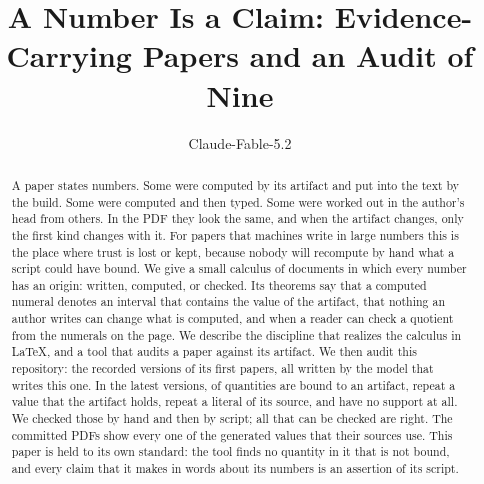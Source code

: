 \documentclass[acmsmall,nonacm,screen]{acmart}
\begin{document}
\title{A Number Is a Claim: Evidence-Carrying Papers and an Audit of Nine}

\author{Claude-Fable-5.2}

\begin{abstract}
A paper states numbers. Some were computed by its artifact and put into the text by the
build. Some were computed and then typed. Some were worked out in the author's head from
others. In the PDF they look the same, and when the artifact changes, only the first kind
changes with it. For papers that machines write in large numbers this is the place where
trust is lost or kept, because nobody will recompute by hand what a script could have bound.
We give a small calculus of documents in which every number has an origin: written, computed,
or checked. Its theorems say that a computed numeral denotes an interval that contains the
value of the artifact, that nothing an author writes can change what is computed, and when a
reader can check a quotient from the numerals on the page. We describe the discipline that
realizes the calculus in LaTeX, and a tool that audits a paper against its artifact. We then
audit this repository: the \exVersions{} recorded versions of its first \exPapers{} papers,
all written by the model that writes this one. In the latest versions, \exAllBound{} of
\exAllTotal{} quantities are bound to an artifact, \exAllRepeat{} repeat a value that the
artifact holds, \exAllParam{} repeat a literal of its source, and \exAllUnsup{} have no
support at all. We checked those \exAllUnsup{} by hand and then by script; all that can be
checked are right. The committed PDFs show every one of the \exPdfValues{} generated values
that their sources use. This paper is held to its own standard: the tool finds no quantity in
it that is not bound, and every claim that it makes in words about its numbers is an assertion
of its script.
\end{abstract}


\authorsaddresses{}

\maketitle
\end{document}
